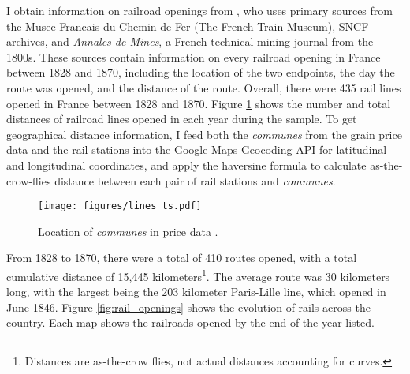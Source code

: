 \documentclass[12pt,twoside]{article}
\begin{document}
I obtain information on railroad openings from \cite{palau2,palau3,palau4}, who uses primary sources from the Musee Francais du Chemin de Fer (The French Train Museum), SNCF archives, and \emph{Annales de Mines}, a French technical mining journal from the 1800s.
These sources contain information on every railroad opening in France between 1828 and 1870, including the location of the two endpoints, the day the route was opened, and the distance of the route.
Overall, there were 435 rail lines opened in France between 1828 and 1870.
Figure \ref{fig:lines_year} shows the number and total distances of railroad lines opened in each year during the sample.
To get geographical distance information, I feed both the \emph{communes} from the grain price data and the rail stations into the Google Maps Geocoding API \citep{google} for latitudinal and longitudinal coordinates, and apply the haversine formula to calculate as-the-crow-flies distance between each pair of rail stations and \emph{communes}.

\begin{figure}[h]
	\centering
	\texttt{[image: figures/lines\_ts.pdf]}
	\caption{Location of \emph{communes} in price data \citep{prices}.}
	\label{fig:lines_year}
\end{figure}

From 1828 to 1870, there were a total of 410 routes opened, with a total cumulative distance of 15,445 kilometers\footnote{Distances are as-the-crow flies, not actual distances accounting for curves.}.
The average route was 30 kilometers long, with the largest being the 203 kilometer Paris-Lille line, which opened in June 1846.
Figure \ref{fig:rail_openings} shows the evolution of rails across the country.
Each map shows the railroads opened by the end of the year listed.
\end{document}
